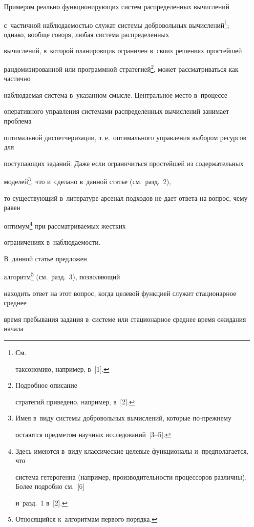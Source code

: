   


  \addtocounter{footnote}{1}


Примером реально функционирующих систем распределенных вычислений 


с~частичной наблюдаемостью служат системы добровольных вычислений\footnote{См.\ 


таксономию, например, в~[1].}; однако, вообще говоря, любая система распределенных 


вычислений, в~которой планировщик ограничен в~своих решениях простейшей 


рандомизированной или программной стратегией\footnote{Подробное описание 


стратегий приведено, например, в~[2].}, может рассматриваться как частично 


наблюдаемая система в~указанном смысле. Центральное место в~процессе 


оперативного управ\-ле\-ния системами распределенных вычислений занимает проблема 


оптимальной диспетчеризации, т.\,е.\ оптимального управления выбором ресурсов для 


поступающих заданий. Даже если ограничиться простейшей из содержательных 


моделей\footnote{Имея в~виду системы добровольных вычислений, которые по-преж\-не\-му 


остаются предметом научных исследований~[3--5].}, что и~сделано в~данной статье (см.\ разд.~2), 


то существующий в~литературе арсенал подходов не дает ответа на вопрос, чему равен 


оптимум\footnote{Здесь имеются в~виду классические целевые функционалы и~предполагается, что 


сис\-те\-ма гетерогенна (например, производительности процессоров различны). Более подробно см.~[6] 


и~разд.~1 в~[2].} при рассматриваемых жестких 


ограничениях в~наблюдаемости.





 В~данной статье предложен 


алгоритм\footnote{Относящийся к~алгоритмам первого порядка.} (см.\ разд.~3), позволяющий 


находить ответ на этот вопрос, когда целевой функцией служит стационарное среднее 


время пребывания задания в~системе или стационарное среднее время ожидания начала 



